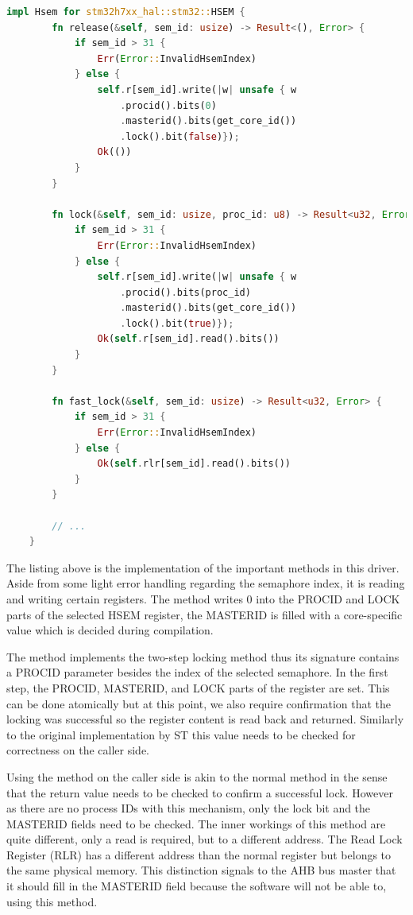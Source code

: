 \begin{lstlisting}[language=Rust,frame=single,float=!ht,style=customrust,label={lst:hsem-impl},caption={HSEM Method Implementations}]
    impl Hsem for stm32h7xx_hal::stm32::HSEM {
        fn release(&self, sem_id: usize) -> Result<(), Error> {
            if sem_id > 31 {
                Err(Error::InvalidHsemIndex)
            } else {
                self.r[sem_id].write(|w| unsafe { w
                    .procid().bits(0)
                    .masterid().bits(get_core_id())
                    .lock().bit(false)});
                Ok(())
            }
        }

        fn lock(&self, sem_id: usize, proc_id: u8) -> Result<u32, Error> {
            if sem_id > 31 {
                Err(Error::InvalidHsemIndex)
            } else {
                self.r[sem_id].write(|w| unsafe { w
                    .procid().bits(proc_id)
                    .masterid().bits(get_core_id())
                    .lock().bit(true)});
                Ok(self.r[sem_id].read().bits())
            }
        }

        fn fast_lock(&self, sem_id: usize) -> Result<u32, Error> {
            if sem_id > 31 {
                Err(Error::InvalidHsemIndex)
            } else {
                Ok(self.rlr[sem_id].read().bits())
            }
        }

        // ...
    }
\end{lstlisting}

The listing above is the implementation of the important methods in this driver. Aside from some light error handling regarding the semaphore index, it is reading and writing certain registers. The  method writes 0 into the PROCID and LOCK parts of the selected HSEM register, the MASTERID is filled with a core-specific value which is decided during compilation.

The  method implements the two-step locking method thus its signature contains a PROCID parameter besides the index of the selected semaphore. In the first step, the PROCID, MASTERID, and LOCK parts of the register are set. This can be done atomically but at this point, we also require confirmation that the locking was successful so the register content is read back and returned. Similarly to the original implementation by ST this value needs to be checked for correctness on the caller side.

Using the  method on the caller side is akin to the normal  method in the sense that the return value needs to be checked to confirm a successful lock. However as there are no process IDs with this mechanism, only the lock bit and the MASTERID fields need to be checked. The inner workings of this method are quite different, only a read is required, but to a different address. The Read Lock Register (RLR) has a different address than the normal register but belongs to the same physical memory. This distinction signals to the AHB bus master that it should fill in the MASTERID field because the software will not be able to, using this method.


